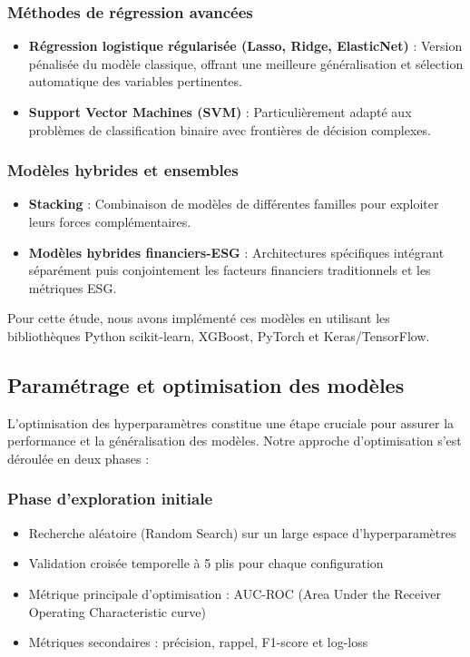 \subsubsection{Méthodes de régression avancées}
\begin{itemize}
  \item \textbf{Régression logistique régularisée (Lasso, Ridge, ElasticNet)} : Version pénalisée du modèle classique, offrant une meilleure généralisation et sélection automatique des variables pertinentes.
  \item \textbf{Support Vector Machines (SVM)} : Particulièrement adapté aux problèmes de classification binaire avec frontières de décision complexes.
\end{itemize}

\subsubsection{Modèles hybrides et ensembles}
\begin{itemize}
  \item \textbf{Stacking} : Combinaison de modèles de différentes familles pour exploiter leurs forces complémentaires.
  \item \textbf{Modèles hybrides financiers-ESG} : Architectures spécifiques intégrant séparément puis conjointement les facteurs financiers traditionnels et les métriques ESG.
\end{itemize}

Pour cette étude, nous avons implémenté ces modèles en utilisant les bibliothèques Python scikit-learn, XGBoost, PyTorch et Keras/TensorFlow.

\subsection{Paramétrage et optimisation des modèles}

L'optimisation des hyperparamètres constitue une étape cruciale pour assurer la performance et la généralisation des modèles. Notre approche d'optimisation s'est déroulée en deux phases :

\subsubsection{Phase d'exploration initiale}
\begin{itemize}
  \item Recherche aléatoire (Random Search) sur un large espace d'hyperparamètres
  \item Validation croisée temporelle à 5 plis pour chaque configuration
  \item Métrique principale d'optimisation : AUC-ROC (Area Under the Receiver Operating Characteristic curve)
  \item Métriques secondaires : précision, rappel, F1-score et log-loss
\end{itemize}

